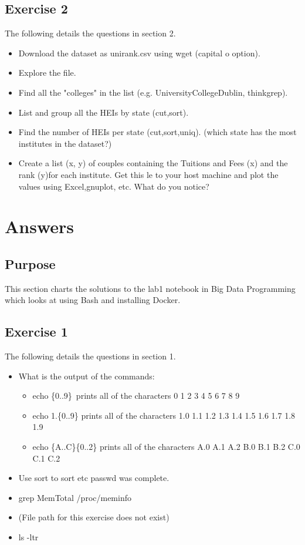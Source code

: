 \documentclass{scrreprt}
\begin{document}
\section{Exercise 2}\label{Overview}
The following details the questions in section 2.
\begin{itemize}
	\item Download the dataset as unirank.csv using wget (capital o option).
	\item Explore the file.
	\item Find all the "colleges" in the list (e.g.  UniversityCollegeDublin, thinkgrep).
	\item List and group all the HEIs by state (cut,sort).
	\item  Find  the  number  of  HEIs  per  state  (cut,sort,uniq).  (which  state  has  the  most institutes in the dataset?)
	\item Create a list (x, y) of couples containing the Tuitions and Fees (x) and the rank (y)for each institute.  Get this  le to your host machine and plot the values using Excel,gnuplot, etc.  What do you notice?
\end{itemize}

\chapter{Answers}\label{Design}

\section{Purpose}\label{Purpose}
This section charts the solutions to the lab1 notebook in Big Data Programming which looks at using Bash and installing Docker.


\section{Exercise 1}\label{Overview}
The following details the questions in section 1.
\begin{itemize}
	\item What is the output of the commands:
	\begin{itemize}
		\item echo \{0..9\}\ prints all of the characters 0 1 2 3 4 5 6 7 8 9 
		\item echo 1.\{0..9\} prints all of the characters  1.0 1.1 1.2 1.3 1.4 1.5 1.6 1.7 1.8 1.9 
		\item echo \{A..C\}\{0..2\} prints all of the characters A.0 A.1 A.2 B.0 B.1 B.2 C.0 C.1 C.2
	\end{itemize}
	\item Use sort to sort etc passwd was complete.
	\item grep MemTotal /proc/meminfo
	\item (File path for this exercise does not exist)
	\item ls -ltr
\end{itemize}
\end{document}
